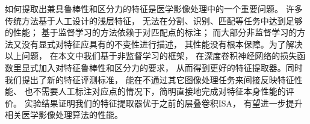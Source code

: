 如何提取出兼具鲁棒性和区分力的特征是医学影像处理中的一个重要问题。
许多传统方法基于人工设计的浅层特征，
无法在分割、识别、匹配等任务中达到足够的性能；
基于监督学习的方法依赖于对匹配点的标注；
而大部分非监督学习的方法又没有显式对特征应具有的不变性进行描述，
其性能没有根本保障。为了解决以上问题，
在本文中我们基于非监督学习的框架，
在深度卷积神经网络的损失函数里显式加入对特征鲁棒性和区分力的要求，
从而得到更好的特征提取器。同时我们提出了新的特征评测标准，
能在不通过其它图像处理任务来间接反映特征性能、
也不需要人工标注对应点的情况下，简明直接地完成对特征本身性能的评价。
实验结果证明我们的特征提取器优于之前的层叠卷积ISA，
有望进一步提升相关医学影像处理算法的性能。
